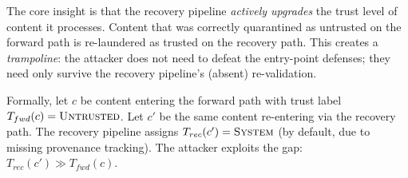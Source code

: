 The core insight is that the recovery pipeline \emph{actively upgrades} the trust level of content it processes. Content that was correctly quarantined as untrusted on the forward path is re-laundered as trusted on the recovery path. This creates a \emph{trampoline}: the attacker does not need to defeat the entry-point defenses; they need only survive the recovery pipeline's (absent) re-validation.

Formally, let $c$ be content entering the forward path with trust label $T_{fwd}(c) = \textsc{Untrusted}$. Let $c'$ be the same content re-entering via the recovery path. The recovery pipeline assigns $T_{rec}(c') = \textsc{System}$ (by default, due to missing provenance tracking). The attacker exploits the gap: $T_{rec}(c') \gg T_{fwd}(c)$.
